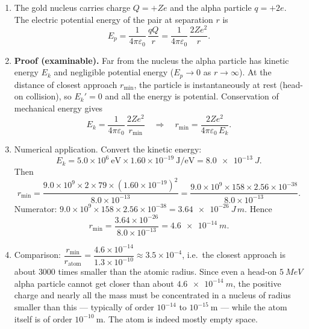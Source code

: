 \documentclass[11pt]{article}
\begin{document}
\begin{corrige}
\begin{enumerate}
\item The gold nucleus carries charge $Q = +Ze$ and the alpha particle $q = +2e$. The electric potential energy of the pair at separation $r$ is
\[ E_p = \frac{1}{4\pi\varepsilon_0}\,\frac{qQ}{r} = \frac{1}{4\pi\varepsilon_0}\,\frac{2Ze^{2}}{r}. \]
\item \textbf{Proof (examinable).} Far from the nucleus the alpha particle has kinetic energy $E_k$ and negligible potential energy ($E_p \to 0$ as $r \to \infty$). At the distance of closest approach $r_{\min}$, the particle is instantaneously at rest (head-on collision), so $E_k' = 0$ and all the energy is potential. Conservation of mechanical energy gives
\[ E_k = \frac{1}{4\pi\varepsilon_0}\,\frac{2Ze^{2}}{r_{\min}}
\quad\Longrightarrow\quad
r_{\min} = \frac{2Ze^{2}}{4\pi\varepsilon_0\,E_k}. \]
\item Numerical application. Convert the kinetic energy:
\[ E_k = 5.0\times 10^{6}\ \mathrm{eV} \times 1.60\times 10^{-19}\ \mathrm{J/eV} = \SI{8.0e-13}{J}. \]
Then
\[ r_{\min} = \frac{9.0\times 10^{9} \times 2 \times 79 \times (1.60\times 10^{-19})^{2}}{8.0\times 10^{-13}}
= \frac{9.0\times 10^{9} \times 158 \times 2.56\times 10^{-38}}{8.0\times 10^{-13}}. \]
Numerator: $9.0\times 10^{9} \times 158 \times 2.56\times 10^{-38} = \SI{3.64e-26}{J\,m}$. Hence
\[ r_{\min} = \frac{3.64\times 10^{-26}}{8.0\times 10^{-13}} = \boxed{\SI{4.6e-14}{m}}. \]
\item Comparison: $\dfrac{r_{\min}}{r_{\text{atom}}} = \dfrac{4.6\times 10^{-14}}{1.3\times 10^{-10}} \approx 3.5\times 10^{-4}$, i.e.\ the closest approach is about $3000$ times smaller than the atomic radius. Since even a head-on $\SI{5}{MeV}$ alpha particle cannot get closer than about $\SI{4.6e-14}{m}$, the positive charge and nearly all the mass must be concentrated in a nucleus of radius smaller than this — typically of order $10^{-14}$ to $10^{-15}\ \mathrm{m}$ — while the atom itself is of order $10^{-10}\ \mathrm{m}$. The atom is indeed mostly empty space.
\end{enumerate}
\end{corrige}
\end{document}
